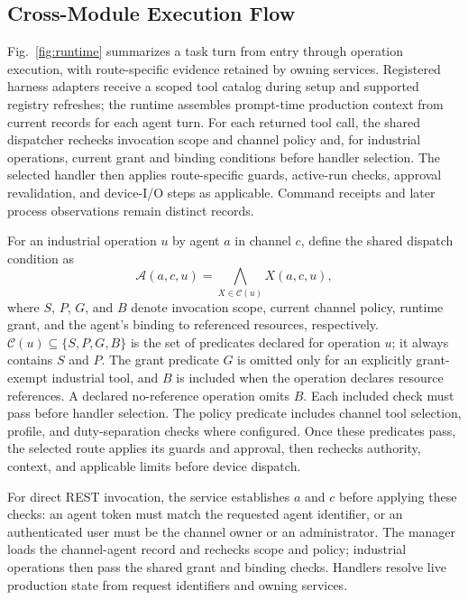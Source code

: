 \subsection{Cross-Module Execution Flow}
\label{sec:executionflow}
Fig.~\ref{fig:runtime} summarizes a task turn from entry through operation
execution, with route-specific evidence retained by owning services. Registered
harness adapters receive a scoped tool catalog during setup and supported
registry refreshes; the runtime assembles prompt-time production context from
current records for each agent turn. For each returned tool call, the shared dispatcher rechecks
invocation scope and channel policy and, for industrial operations, current
grant and binding conditions before handler selection. The selected handler
then applies route-specific guards, active-run checks, approval
revalidation, and device-I/O steps as applicable. Command receipts and later
process observations remain distinct records.

For an industrial operation $u$ by agent $a$ in channel $c$, define the
shared dispatch condition as
\begin{equation}
\mathcal{A}(a,c,u)=\bigwedge_{X\in\mathcal{C}(u)}X(a,c,u),
\label{eq:dispatch-contract}
\end{equation}
where $S$, $P$, $G$, and $B$ denote invocation scope, current channel policy,
runtime grant, and the agent's binding to referenced resources, respectively.
$\mathcal{C}(u)\subseteq\{S,P,G,B\}$ is the set of predicates declared for
operation $u$; it always contains $S$ and $P$. The grant predicate $G$ is
omitted only for an explicitly grant-exempt industrial tool, and $B$ is
included when the operation declares resource references. A declared
no-reference operation omits $B$. Each included check must pass before
handler selection. The policy predicate includes channel tool selection,
profile, and duty-separation checks where configured. Once these predicates
pass, the selected route applies its guards and approval, then rechecks
authority, context, and applicable limits before device dispatch.

For direct REST invocation, the service establishes $a$ and $c$ before applying
these checks: an agent token must match the requested agent identifier, or an
authenticated user must be the channel owner or an administrator. The manager
loads the channel-agent record and rechecks scope and policy; industrial
operations then pass the shared grant and binding checks. Handlers resolve live
production state from request identifiers and owning services.

